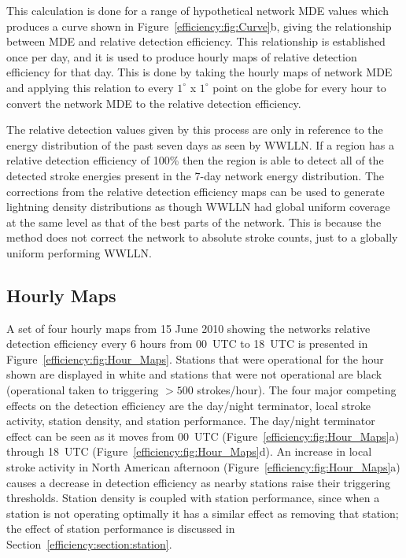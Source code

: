 This calculation is done for a range of hypothetical network MDE values which produces a curve shown in Figure~\ref{efficiency:fig:Curve}b, giving the relationship between MDE and relative detection efficiency.
This relationship is established once per day, and it is used to produce hourly maps of relative detection efficiency for that day.
This is done by taking the hourly maps of network MDE and applying this relation to every $1^\circ$ x $1^\circ$ point on the globe for every hour to convert the network MDE to the relative detection efficiency.

The relative detection values given by this process are only in reference to the energy distribution of the past seven days as seen by WWLLN.
If a region has a relative detection efficiency of 100\% then the region is able to detect all of the detected stroke energies present in the 7-day network energy distribution.
The corrections from the relative detection efficiency maps can be used to generate lightning density distributions as though WWLLN had global uniform coverage at the same level as that of the best parts of the network.
This is because the method does not correct the network to absolute stroke counts, just to a globally uniform performing WWLLN.

\subsection{Hourly Maps}

A set of four hourly maps from 15 June 2010 showing the networks relative detection efficiency every 6 hours from 00~UTC to 18~UTC is presented in Figure~\ref{efficiency:fig:Hour_Maps}.
Stations that were operational for the hour shown are displayed in white and stations that were not operational are black (operational taken to triggering $>500$ strokes/hour).
The four major competing effects on the detection efficiency are the day/night terminator, local stroke activity, station density, and station performance.
The day/night terminator effect can be seen as it moves from 00~UTC (Figure~\ref{efficiency:fig:Hour_Maps}a) through 18~UTC (Figure~\ref{efficiency:fig:Hour_Maps}d).
An increase in local stroke activity in North American afternoon (Figure~\ref{efficiency:fig:Hour_Maps}a) causes a decrease in detection efficiency as nearby stations raise their triggering thresholds.
Station density is coupled with station performance, since when a station is not operating optimally it has a similar effect as removing that station; the effect of station performance is discussed in Section~\ref{efficiency:section:station}.

